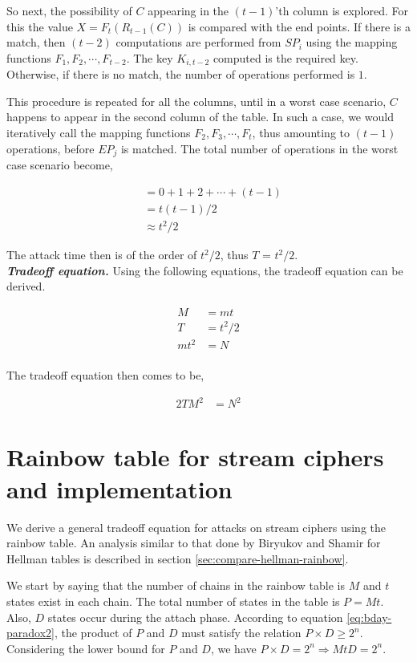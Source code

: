 So next, the possibility of $C$ appearing in the $(t-1)$'th column is explored. For this the value $X = F_{t}(R_{t-1}(C))$ is compared with the end points. If there is a match, then $(t-2)$ computations are performed from $SP_{i}$ using the mapping functions $F_1, F_2, \cdots, F_{t-2}$. The key $K_{i,t-2}$ computed is the required key. Otherwise, if there is no match, the number of operations performed is $1$.

This procedure is repeated for all the columns, until in a worst case scenario, $C$ happens to appear in the second column of the table. In such a case, we would iteratively call the mapping functions $F_2, F_3, \cdots, F_t$, thus amounting to $(t-1)$ operations, before $EP_j$ is matched. The total number of operations in the worst case scenario become, 

\begin{align*}
&= 0 + 1 + 2 + \cdots + (t-1)\\
&= t(t-1)/2\\
&\approx t^2/2
\end{align*}

The attack time then is of the order of $t^2/2$, thus $T$ = $t^2/2$.\\


\noindent \textit{\textbf{Tradeoff equation.}} Using the following equations, the tradeoff equation can be derived. 

\begin{align*}
M &= mt\\
T &= t^2/2\\
mt^2 &= N\\
\end{align*}

The tradeoff equation then comes to be,

\begin{align}
\label{eq:tmdto-rainbow-block} 2TM^2 &= N^2
\end{align}


\section{Rainbow table for stream ciphers and implementation}
\label{sec:rainbow-stream}

We derive a general tradeoff equation for attacks on stream ciphers using the rainbow table. An analysis similar to that done by Biryukov and Shamir for Hellman tables is described in section \ref{sec:compare-hellman-rainbow}. 

We start by saying that the number of chains in the rainbow table is $M$ and $t$ states exist in each chain. The total number of states in the table is $P = Mt$. Also, $D$ states occur during the attach phase. According to equation \ref{eq:bday-paradox2}, the product of $P$ and $D$ must satisfy the relation $P \times D \geq 2^n$. Considering the lower bound for $P$ and $D$, we have $P \times D = 2^n \Rightarrow MtD = 2^n$.
 
